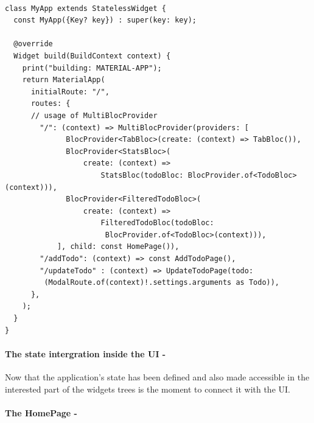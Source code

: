 \begin{code}
\mbox{}\\
 \mbox{}
\label{code:2.14}
\begin{verbatim}
class MyApp extends StatelessWidget {
  const MyApp({Key? key}) : super(key: key);

  @override
  Widget build(BuildContext context) {
    print("building: MATERIAL-APP");
    return MaterialApp(
      initialRoute: "/",
      routes: {
      // usage of MultiBlocProvider
        "/": (context) => MultiBlocProvider(providers: [
              BlocProvider<TabBloc>(create: (context) => TabBloc()),
              BlocProvider<StatsBloc>(
                  create: (context) =>
                      StatsBloc(todoBloc: BlocProvider.of<TodoBloc>(context))),
              BlocProvider<FilteredTodoBloc>(
                  create: (context) =>
                      FilteredTodoBloc(todoBloc:
                       BlocProvider.of<TodoBloc>(context))),
            ], child: const HomePage()),
        "/addTodo": (context) => const AddTodoPage(),
        "/updateTodo" : (context) => UpdateTodoPage(todo:
         (ModalRoute.of(context)!.settings.arguments as Todo)),
      },
    );
  }
}
\end{verbatim}
\mbox{}
\end{code}


\paragraph{The state intergration inside the UI - }
\label{subpar:todo_app_bloc_core_state}
Now that the application's state has been defined and also made accessible in the interested part of the widgets trees is the moment to connect it with the UI.

\paragraph{The HomePage - }
\label{subpar:todo_app_bloc_core_state}

